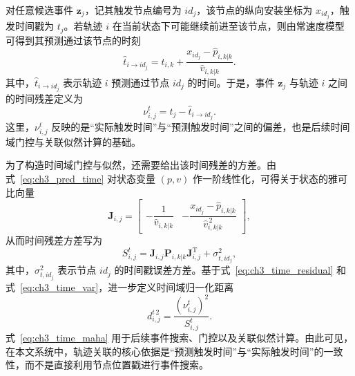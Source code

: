 \documentclass{xdupgthesis}
\begin{document}
对任意候选事件 $\mathbf z_j$，记其触发节点编号为 $id_j$，该节点的纵向安装坐标为 $x_{id_j}$，触发时间戳为 $t_j$。若轨迹 $i$ 在当前状态下可能继续前进至该节点，则由常速度模型可得到其预测通过该节点的时刻
\begin{equation}
	\hat t_{i\rightarrow id_j}
	=
	t_{i,k}
	+
	\frac{x_{id_j}-\hat p_{i,k|k}}{\hat v_{i,k|k}}.
	\label{eq:ch3_pred_time}
\end{equation}
其中，$\hat t_{i\rightarrow id_j}$ 表示轨迹 $i$ 预测通过节点 $id_j$ 的时间。于是，事件 $\mathbf z_j$ 与轨迹 $i$ 之间的时间残差定义为
\begin{equation}
	\nu^{t}_{i,j}
	=
	t_j-\hat t_{i\rightarrow id_j}.
	\label{eq:ch3_time_residual}
\end{equation}
这里，$\nu^{t}_{i,j}$ 反映的是“实际触发时间”与“预测触发时间”之间的偏差，也是后续时间域门控与关联似然计算的基础。

为了构造时间域门控与似然，还需要给出该时间残差的方差。由式~\eqref{eq:ch3_pred_time} 对状态变量 $(p,v)$ 作一阶线性化，可得关于状态的雅可比向量
\begin{equation}
	\mathbf J_{i,j}
	=
	\begin{bmatrix}
		-\dfrac{1}{\hat v_{i,k|k}}
		&
		-\dfrac{x_{id_j}-\hat p_{i,k|k}}{\hat v_{i,k|k}^{\,2}}
	\end{bmatrix},
	\label{eq:ch3_time_jacobian}
\end{equation}
从而时间残差方差写为
\begin{equation}
	S^{t}_{i,j}
	=
	\mathbf J_{i,j}\mathbf P_{i,k|k}\mathbf J_{i,j}^{\mathrm T}
	+
	\sigma_{t,id_j}^{2},
	\label{eq:ch3_time_var}
\end{equation}
其中，$\sigma_{t,id_j}^{2}$ 表示节点 $id_j$ 的时间戳误差方差。基于式~\eqref{eq:ch3_time_residual} 和式~\eqref{eq:ch3_time_var}，进一步定义时间域归一化距离
\begin{equation}
	d^{t\,2}_{i,j}
	=
	\frac{\left(\nu^{t}_{i,j}\right)^2}{S^{t}_{i,j}}.
	\label{eq:ch3_time_maha}
\end{equation}
式~\eqref{eq:ch3_time_maha} 用于后续事件搜索、门控以及关联似然计算。由此可见，在本文系统中，轨迹关联的核心依据是“预测触发时间”与“实际触发时间”的一致性，而不是直接利用节点位置戳进行事件搜索。
\end{document}
